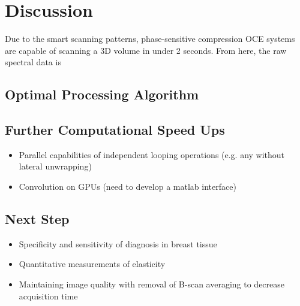 \chapter{Discussion}

Due to the smart scanning patterns, phase-sensitive compression OCE systems are capable of scanning a 3D volume in under 2 seconds. From here, the raw spectral data is 

\section{Optimal Processing Algorithm}

\section{Further Computational Speed Ups}

\begin{itemize}
\item Parallel capabilities of independent looping operations (e.g. any without lateral unwrapping)
\item Convolution on GPUs (need to develop a matlab interface)
\end{itemize}

\section{Next Step}

\begin{itemize}
\item Specificity and sensitivity of diagnosis in breast tissue
\item Quantitative measurements of elasticity
\item Maintaining image quality with removal of B-scan averaging to decrease acquisition time
\end{itemize}
